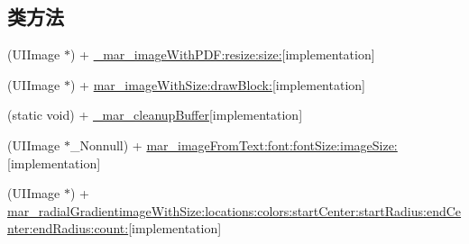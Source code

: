 \subsection*{类方法}
\begin{DoxyCompactItemize}
\item 
(U\+I\+Image $\ast$) + \hyperlink{category_u_i_image_07_m_a_r_e_x_08_aa3b1c13b0aef550c0db3cb736a2c0739}{\+\_\+mar\+\_\+image\+With\+P\+D\+F\+:resize\+:size\+:}{\ttfamily  \mbox{[}implementation\mbox{]}}
\item 
(U\+I\+Image $\ast$) + \hyperlink{category_u_i_image_07_m_a_r_e_x_08_a27acc213edcfa311f05a6e9ecc6f1d5c}{mar\+\_\+image\+With\+Size\+:draw\+Block\+:}{\ttfamily  \mbox{[}implementation\mbox{]}}
\item 
(static void) + \hyperlink{category_u_i_image_07_m_a_r_e_x_08_a39616677076eda34267aeb248726789e}{\+\_\+mar\+\_\+cleanup\+Buffer}{\ttfamily  \mbox{[}implementation\mbox{]}}
\item 
(U\+I\+Image $\ast$\+\_\+\+Nonnull) + \hyperlink{category_u_i_image_07_m_a_r_e_x_08_ab5645679f43c631a9bcb54c0154409fa}{mar\+\_\+image\+From\+Text\+:font\+:font\+Size\+:image\+Size\+:}{\ttfamily  \mbox{[}implementation\mbox{]}}
\item 
(U\+I\+Image $\ast$) + \hyperlink{category_u_i_image_07_m_a_r_e_x_08_aa2393056e3dfa282a3041c064091b7eb}{mar\+\_\+radial\+Gradientimage\+With\+Size\+:locations\+:colors\+:start\+Center\+:start\+Radius\+:end\+Center\+:end\+Radius\+:count\+:}{\ttfamily  \mbox{[}implementation\mbox{]}}
\end{DoxyCompactItemize}
